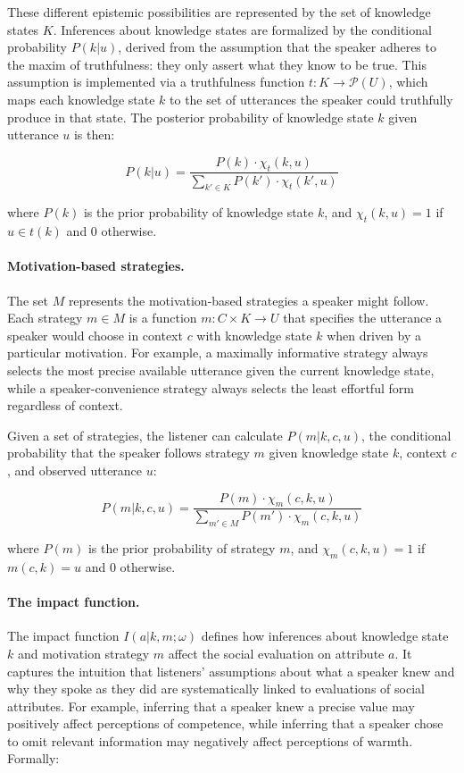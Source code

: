 \documentclass[12pt,a4paper]{article}
\begin{document}
These different epistemic possibilities are represented by the set of knowledge
states $K$. Inferences about knowledge states are formalized by the conditional
probability $P(k|u)$, derived from the assumption that the speaker adheres to
the maxim of truthfulness: they only assert what they know to be true. This
assumption is implemented via a truthfulness function $t: K \rightarrow \mathcal{P}(U)$,
which maps each knowledge state $k$ to the set of utterances the speaker could
truthfully produce in that state. The posterior probability of knowledge state
$k$ given utterance $u$ is then:

\begin{equation}
P(k|u) = \frac{P(k) \cdot \chi_t(k,u)}
               {\sum_{k' \in K} P(k') \cdot \chi_t(k',u)}
\label{eq2}
\end{equation}

\noindent where $P(k)$ is the prior probability of knowledge state $k$, and
$\chi_t(k,u) = 1$ if $u \in t(k)$ and $0$ otherwise.

\paragraph{Motivation-based strategies.}
The set $M$ represents the motivation-based strategies a speaker might follow.
Each strategy $m \in M$ is a function $m: C \times K \rightarrow U$ that
specifies the utterance a speaker would choose in context $c$ with knowledge
state $k$ when driven by a particular motivation. For example, a maximally
informative strategy always selects the most precise available utterance given
the current knowledge state, while a speaker-convenience strategy always selects
the least effortful form regardless of context.

Given a set of strategies, the listener can calculate $P(m|k,c,u)$, the
conditional probability that the speaker follows strategy $m$ given knowledge
state $k$, context $c$, and observed utterance $u$:

\begin{equation}
P(m|k,c,u) = \frac{P(m) \cdot \chi_m(c,k,u)}
                  {\sum_{m' \in M} P(m') \cdot \chi_m(c,k,u)}
\label{eq3}
\end{equation}

\noindent where $P(m)$ is the prior probability of strategy $m$, and
$\chi_m(c,k,u) = 1$ if $m(c,k) = u$ and $0$ otherwise.

\paragraph{The impact function.}
The impact function $I(a|k,m;\omega)$ defines how inferences about knowledge
state $k$ and motivation strategy $m$ affect the social evaluation on attribute
$a$. It captures the intuition that listeners' assumptions about what a speaker
knew and why they spoke as they did are systematically linked to evaluations of
social attributes. For example, inferring that a speaker knew a precise value
may positively affect perceptions of competence, while inferring that a speaker
chose to omit relevant information may negatively affect perceptions of warmth.
Formally:
\end{document}
